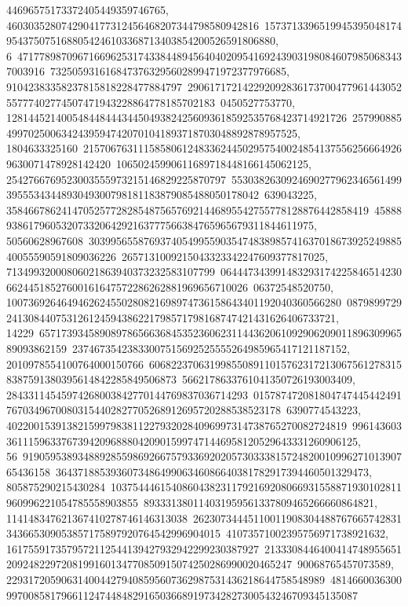 {{{44696575173372405449359746765, 4603035280742904177312456468207344798580942816\
15737133965199453950481749543750751688054246103368713403854200526591806880, 6\
47177898709671669625317433844894564040209541692439031980846079850683437003916\
7325059316168473763295602899471972377976685, 91042383358237815818228477884797\
29061717214229209283617370047796144305255777402774507471943228864778185702183\
0450527753770, 12814452140054844844434450493824256093618592535768423714921726\
25799088549970250063424395947420701041893718703048892878957525, 1804633325160\
21570676311158580612483362445029575400248541375562566649269630071478928142420\
10650245990611689718448166145062125, 2542766769523003555973215146829225870797\
55303826309246902779623465614993955534344893049300798181183879085488050178042\
639043225, 358466786241470525772828548756576921446895542755778128876442858419\
4588893861796053207332064292163777566384765965679311844611975, 50560628967608\
30399565587693740549955903547483898574163701867392524988540055590591809036226\
2657131009215043323342247609377817025, 71349932000806021863940373232583107799\
06444734399148329317422584651423066244518527600161647572286262881969656710026\
06372548520750, 1007369264649462624550280821698974736158643401192040360566280\
0879899729241308440753126124594386221798571798168747421431626406733721, 14229\
65717393458908978656636845352360623114436206109290620901189630996589093862159\
23746735423833007515692525555264985965417121187152, 2010978554100764000150766\
60682237063199855089110157623172130675612783158387591380395614842285849506873\
5662178633761041350726193003409, 28433114545974268003842770144769837036714293\
01578747208180474744544249176703496700803154402827705268912695720288538523178\
6390774543223, 40220015391382159979838112279320284096997314738765270082724819\
9961436033611159633767394209688804209015997471446958120529643331260906125, 56\
91905953893488928559869266757933692020573033381572482001099627101390765436158\
364371885393607348649906346086640381782917394460501329473, 805875290215430284\
10375444615408604382311792169208066931558871930102811960996221054785558903855\
893331380114031959561337809465266660864821, 114148347621367410278746146313038\
26230734445110011908304488767665742831343665309053857175897920764542996904015\
41073571002395756971738921632, 1617559173579572112544139427932942299230387927\
21333084464004147489556512092482297208199160134770850915074250286990020465247\
90068765457073589, 2293172059063140044279408595607362987531436218644758548989\
48146600363009970085817966112474484829165036689197342827300543246709345135087\
}}}
